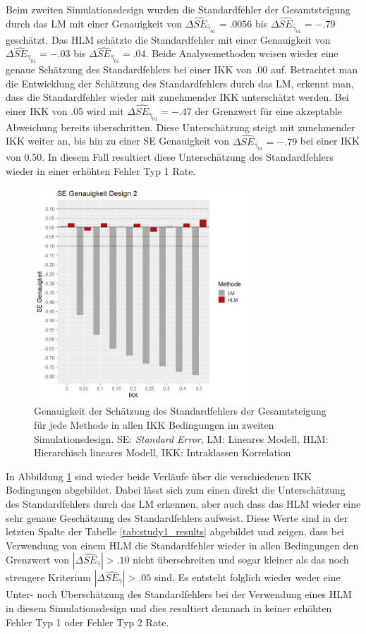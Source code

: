 \documentclass[12pt]{article}\usepackage[]{graphicx}\usepackage[]{color}
\begin{document}
Beim zweiten Simulationsdesign wurden die Standardfehler der Gesamtsteigung durch das LM mit einer Genauigkeit von $\Delta\widehat{SE}_{\widehat{\gamma}_{01}} = .0056$ bis $\Delta\widehat{SE}_{\widehat{\gamma}_{01}} = -.79$ geschätzt. Das HLM schätzte die Standardfehler mit einer Genauigkeit von $\Delta\widehat{SE}_{\widehat{\gamma}_{01}} = -.03$ bis $\Delta\widehat{SE}_{\widehat{\gamma}_{01}} = .04$. Beide Analysemethoden weisen wieder eine genaue Schätzung des Standardfehlers bei einer IKK von .00 auf. Betrachtet man die Entwicklung der Schätzung des Standardfehlers durch das LM, erkennt man, dass die Standardfehler wieder mit zunehmender IKK unterschätzt werden. Bei einer IKK von .05 wird mit $\Delta\widehat{SE}_{\widehat{\gamma}_{01}} = -.47$ der Grenzwert für eine akzeptable Abweichung bereits überschritten. Diese Unterschätzung steigt mit zunehmender IKK weiter an, bis hin zu einer SE Genauigkeit von $\Delta\widehat{SE}_{\widehat{\gamma}_{01}} = -.79$ bei einer IKK von 0.50. In diesem Fall resultiert diese Unterschätzung des Standardfehlers wieder in einer erhöhten Fehler Typ 1 Rate.
\begin{figure}[t!]
\centering
\captionsetup{width=8cm}
\includegraphics[width=8cm, height=8cm]{se_genauigkeit_design2}
\caption{Genauigkeit der Schätzung des Standardfehlers der Gesamtsteigung für jede Methode in allen IKK Bedingungen im zweiten Simulationsdesign. SE: \textit{Standard Error}, LM: Lineares Modell, HLM: Hierarchisch lineares Modell, IKK: Intraklassen Korrelation}
\label{fig:se_genauigkeit_design2}
\end{figure}
In Abbildung \ref{fig:se_genauigkeit_design2} sind wieder beide Verläufe über die verschiedenen IKK Bedingungen abgebildet. Dabei lässt sich zum einen direkt die Unterschätzung des Standardfehlers durch das LM erkennen, aber auch dass das HLM wieder eine sehr genaue Geschätzung des Standardfehlers aufweist. Diese Werte sind in der letzten Spalte der Tabelle \ref{tab:study1_results} abgebildet und zeigen, dass bei Verwendung von einem HLM die Standardfehler wieder in allen Bedingungen den Grenzwert von $|\Delta\widehat{SE}_{\widehat{\gamma}}| > .10$ nicht überschreiten und sogar kleiner als das noch strengere Kriterium $|\Delta\widehat{SE}_{\widehat{\gamma}}| > .05$ sind. Es entsteht folglich wieder weder eine Unter- noch Überschätzung des Standardfehlers bei der Verwendung eines HLM in diesem Simulationsdesign und dies resultiert demnach in keiner erhöhten Fehler Typ 1 oder Fehler Typ 2 Rate.
\end{document}
